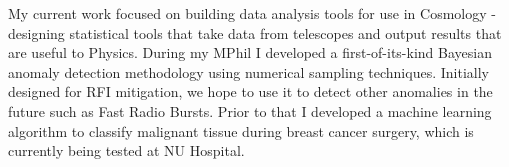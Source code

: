 My current work focused on building data analysis tools for use in Cosmology - designing statistical tools that take data from telescopes and output results that are useful to Physics. During my MPhil I developed a first-of-its-kind Bayesian anomaly detection methodology using numerical sampling techniques. Initially designed for RFI mitigation, we hope to use it to detect other anomalies in the future such as Fast Radio Bursts. Prior to that I developed a machine learning algorithm to classify malignant tissue during breast cancer surgery, which is currently being tested at NU Hospital.


